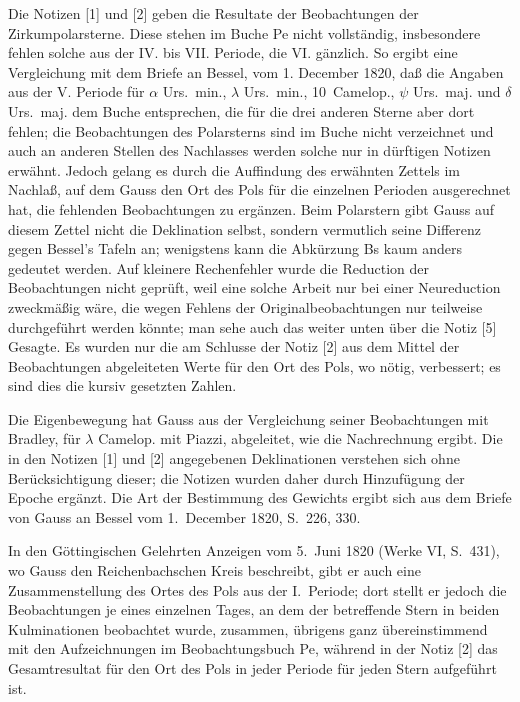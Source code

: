 \documentclass[12pt,a4paper]{article}
\theoremstyle{plain}
\theoremstyle{definition}
\theoremstyle{remark}
\begin{document}
Die Notizen [1] und [2] geben die Resultate der Beobachtungen der Zirkumpolarsterne. Diese stehen im Buche Pe nicht vollst\"andig, insbesondere fehlen solche aus der IV. bis VII. Periode, die VI. g\"anzlich. So ergibt eine Vergleichung mit dem Briefe an Bessel, vom 1. December 1820, da\ss{} die Angaben aus der V. Periode f\"ur $\alpha$ Urs.~min., $\lambda$ Urs.~min., 10~Camelop., $\psi$ Urs.~maj. und $\delta$ Urs.~maj. dem Buche entsprechen, die f\"ur die drei anderen Sterne aber dort fehlen; die Beobachtungen des Polarsterns sind im Buche nicht verzeichnet und auch an anderen Stellen des Nachlasses werden solche nur in d\"urftigen Notizen erw\"ahnt. Jedoch gelang es durch die Auffindung des erw\"ahnten Zettels im Nachla\ss, auf dem Gauss den \glqq Ort des Pols\grqq{} f\"ur die einzelnen Perioden ausgerechnet hat, die fehlenden Beobachtungen zu erg\"anzen. Beim Polarstern gibt Gauss auf diesem Zettel nicht die Deklination selbst, sondern vermutlich seine Differenz gegen Bessel's Tafeln an; wenigstens kann die Abk\"urzung \glqq Bs\grqq{} kaum anders gedeutet werden. Auf kleinere Rechenfehler wurde die Reduction der Beobachtungen nicht gepr\"uft, weil eine solche Arbeit nur bei einer Neureduction zweckm\"a\ss ig w\"are, die wegen Fehlens der Originalbeobachtungen nur teilweise durchgef\"uhrt werden k\"onnte; man sehe auch das weiter unten \"uber die Notiz [5] Gesagte. Es wurden nur die am Schlusse der Notiz [2] aus dem Mittel der Beobachtungen abgeleiteten Werte f\"ur den \glqq Ort des Pols\grqq, wo n\"otig, verbessert; es sind dies die kursiv gesetzten Zahlen.

Die Eigenbewegung hat Gauss aus der Vergleichung seiner Beobachtungen mit Bradley, f\"ur $\lambda$ Camelop. mit Piazzi, abgeleitet, wie die Nachrechnung ergibt. Die in den Notizen [1] und [2] angegebenen Deklinationen verstehen sich ohne Ber\"ucksichtigung dieser; die Notizen wurden daher durch Hinzuf\"ugung der Epoche erg\"anzt. Die Art der Bestimmung des Gewichts ergibt sich aus dem Briefe von Gauss an Bessel vom 1.~December 1820, S.~226, 330.

In den G\"ottingischen Gelehrten Anzeigen vom 5.~Juni 1820 (Werke VI, S.~431), wo Gauss den Reichenbachschen Kreis beschreibt, gibt er auch eine Zusammenstellung des Ortes des Pols aus der I.~Periode; dort stellt er jedoch die Beobachtungen je eines einzelnen Tages, an dem der betreffende Stern in beiden Kulminationen beobachtet wurde, zusammen, \"ubrigens ganz \"ubereinstimmend mit den Aufzeichnungen im Beobachtungsbuch Pe, w\"ahrend in der Notiz [2] das Gesamtresultat f\"ur den Ort des Pols in jeder Periode f\"ur jeden Stern aufgef\"uhrt ist.
\end{document}
